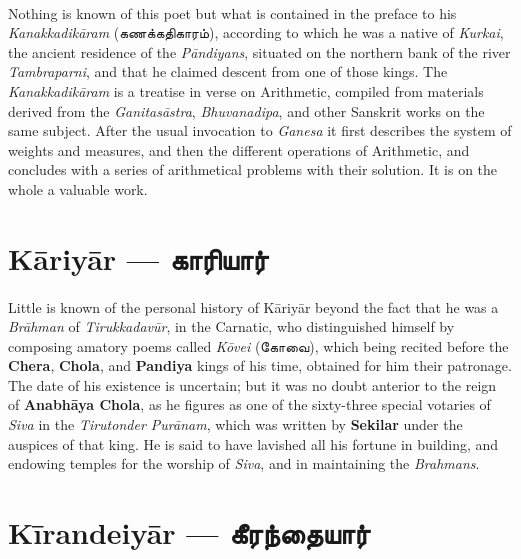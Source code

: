 \documentclass{article}
\newcommand{\TamilText}[1]{\texttamil{#1}}
\newcommand{\TamilBold}[1]{\texttamil{\textbf{#1}}}
\newcommand{\tam}[1]{\TamilText{#1}}
\newcommand{\tambold}[1]{\TamilBold{#1}}
\begin{document}
\paragraph{}
Nothing is known of this poet but what is contained in the preface to his \emph{Kanakkadik\={a}ram} (\tam{கணக்கதிகாரம்}), according to which he was a native of \emph{Kurkai}, the ancient residence of the \emph{P\={a}ndiyans}, situated on the northern bank of the river \emph{Tambraparni}, and that he claimed descent from one of those kings. The \emph{Kanakkadik\={a}ram} is a treatise in verse on Arithmetic, compiled from materials derived from the \emph{Ganitas\={a}stra}, \emph{Bhuvanadipa}, and other Sanskrit works on the same subject. After the usual invocation to \emph{Ganesa} it first describes the system of weights and measures, and then the different operations of Arithmetic, and concludes with a series of arithmetical problems with their solution. It is on the whole a valuable work.

\section{K\={a}riy\={a}r --- \tambold{காரியார்}}
\paragraph{}
Little is known of the personal history of K\={a}riy\={a}r beyond the fact that he was a \emph{Br\={a}hman} of \emph{Tirukkadav\={u}r}, in the Carnatic, who distinguished himself by composing amatory poems called \emph{K\={o}vei} (\tam{கோவை}), which being recited before the \textbf{Chera}, \textbf{Chola}, and \textbf{Pandiya} kings of his time, obtained for him their patronage. The date of his existence is uncertain; but it was no doubt anterior to the reign of \textbf{Anabh\={a}ya Chola}, as he figures as one of the sixty-three special votaries of \emph{Siva} in the \emph{Tirutonder Pur\={a}nam}, which was written by \textbf{Sekilar} under the auspices of that king. He is said to have lavished all his fortune in building, and endowing temples for the worship of \emph{Siva}, and in maintaining the \emph{Brahmans}.

\section{K\={i}randeiy\={a}r --- \tambold{கீரந்தையார்}}
\end{document}
